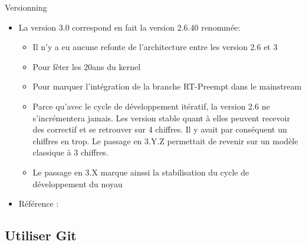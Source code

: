 \begin{frame}[fragile=singleslide]{Versionning}
  \begin{itemize}
  \item La version 3.0 correspond en fait la version 2.6.40 renommée:
    \begin{itemize}
    \item  Il n'y  a eu  aucune  refonte de  l'architecture entre  les
      version 2.6 et 3
    \item Pour fêter les 20ans du kernel
    \item Pour marquer l'intégration  de la branche RT-Preempt dans le
      mainstream
    \item  Parce  qu'avec  le  cycle de  développement  itératif,  la
      version 2.6 ne s'incrémentera jamais. Les version stable quant à
      elles  peuvent recevoir  des  correctif et  se  retrouver sur  4
      chiffres.  Il y  avait par  conséquent un  chiffres en  trop. Le
      passage en 3.Y.Z permettait de revenir sur un modèle classique à
      3 chiffres.
    \item Le passage en 3.X marque ainssi la stabilisation du cycle de
      développement du noyau
    \end{itemize} 
  \item Référence : 
  \end{itemize} 
\end{frame} 

\subsection{Utiliser Git}


